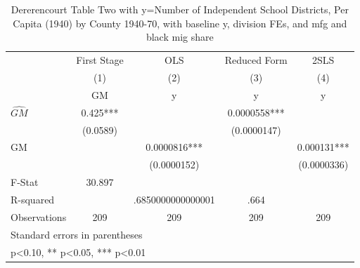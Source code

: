 \begin{table}[htbp]\centering
\def\sym#1{\ifmmode^{#1}\else\(^{#1}\)\fi}
\caption{Dererencourt Table Two with y=Number of Independent School Districts, Per Capita (1940) by County 1940-70, with baseline y, division FEs, and mfg and black mig share}
\begin{tabular}{l*{4}{c}}
\toprule
                    & First Stage   &         OLS   &Reduced Form   &        2SLS   \\
                    &\multicolumn{1}{c}{(1)}&\multicolumn{1}{c}{(2)}&\multicolumn{1}{c}{(3)}&\multicolumn{1}{c}{(4)}\\
                    &\multicolumn{1}{c}{GM}&\multicolumn{1}{c}{y}&\multicolumn{1}{c}{y}&\multicolumn{1}{c}{y}\\
\midrule
$\hat{GM}$          &       0.425***&               &   0.0000558***&               \\
                    &    (0.0589)   &               & (0.0000147)   &               \\
\addlinespace
GM                  &               &   0.0000816***&               &    0.000131***\\
                    &               & (0.0000152)   &               & (0.0000336)   \\
\midrule
F-Stat              &      30.897   &               &               &               \\
R-squared           &               &.6850000000000001   &        .664   &               \\
Observations        &         209   &         209   &         209   &         209   \\
\bottomrule
\multicolumn{5}{l}{\footnotesize Standard errors in parentheses}\\
\multicolumn{5}{l}{\footnotesize * p<0.10, ** p<0.05, *** p<0.01}\\
\end{tabular}
\end{table}
